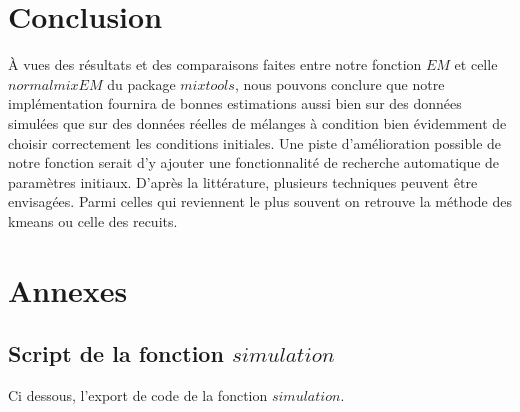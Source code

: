 \documentclass[a4paper,french,10pt]{article}
\begin{document}



\newpage

\section{Conclusion}

À vues des résultats et des comparaisons faites entre notre fonction $EM$ et celle $normalmixEM$ du package $mixtools$, nous pouvons conclure que notre implémentation fournira de bonnes estimations aussi bien sur des données simulées que sur des données réelles de mélanges à condition bien évidemment de choisir correctement les conditions initiales. Une piste d'amélioration possible de notre fonction serait d'y ajouter une fonctionnalité de recherche automatique de paramètres initiaux. D'après la littérature, plusieurs techniques peuvent être envisagées. Parmi celles qui reviennent le plus souvent on retrouve la méthode des kmeans ou celle des recuits.


\newpage

\section{Annexes}
\subsection{Script de la fonction $simulation$}
Ci dessous, l'export de code de la fonction $simulation$.

\end{document}
